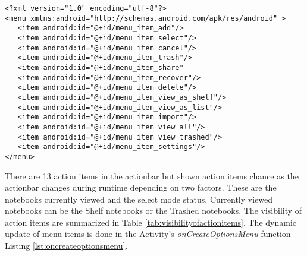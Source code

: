 \begin{lstlisting}[frame=single, label=lst:actionbarshelfxml, caption=actionbar\_shelf.xml]
<?xml version="1.0" encoding="utf-8"?>
<menu xmlns:android="http://schemas.android.com/apk/res/android" >
   <item android:id="@+id/menu_item_add"/>
   <item android:id="@+id/menu_item_select"/>
   <item android:id="@+id/menu_item_cancel"/>
   <item android:id="@+id/menu_item_trash"/>
   <item android:id="@+id/menu_item_share"
   <item android:id="@+id/menu_item_recover"/>
   <item android:id="@+id/menu_item_delete"/>
   <item android:id="@+id/menu_item_view_as_shelf"/>
   <item android:id="@+id/menu_item_view_as_list"/>
   <item android:id="@+id/menu_item_import"/>
   <item android:id="@+id/menu_item_view_all"/>
   <item android:id="@+id/menu_item_view_trashed"/> 
   <item android:id="@+id/menu_item_settings"/>
</menu>
\end{lstlisting}

There are 13 action items in the actionbar but shown action items chance as the actionbar changes during runtime depending on two factors. These are the notebooks currently viewed and the select mode status. Currently viewed notebooks can be the Shelf notebooks or the Trashed notebooks. The visibility of action items are summarized in Table \ref{tab:visibilityofactionitems}. The dynamic update of menu items is done in the Activity's \textit{onCreateOptionsMenu} function Listing \ref{lst:oncreateoptionsmenu}.

